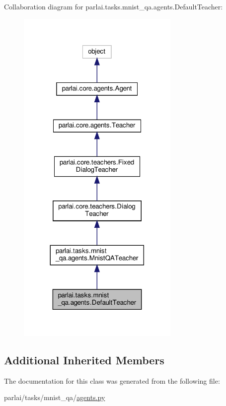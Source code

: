 Collaboration diagram for parlai.\+tasks.\+mnist\+\_\+qa.\+agents.\+Default\+Teacher\+:
\nopagebreak
\begin{figure}[H]
\begin{center}
\leavevmode
\includegraphics[width=221pt]{classparlai_1_1tasks_1_1mnist__qa_1_1agents_1_1DefaultTeacher__coll__graph}
\end{center}
\end{figure}
\subsection*{Additional Inherited Members}


The documentation for this class was generated from the following file\+:\begin{DoxyCompactItemize}
\item 
parlai/tasks/mnist\+\_\+qa/\hyperlink{parlai_2tasks_2mnist__qa_2agents_8py}{agents.\+py}\end{DoxyCompactItemize}
